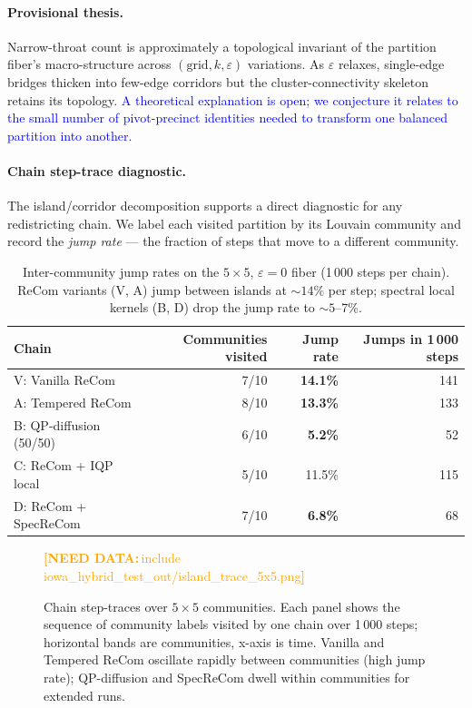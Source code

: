 \documentclass[11pt]{article}
\newcommand{\needdata}[1]{\textcolor{orange}{\textbf{[NEED DATA:}\,#1\textbf{]}}}
\newcommand{\draft}[1]{\textcolor{blue}{#1}}
\begin{document}
\paragraph{Provisional thesis.} Narrow-throat count is approximately a
topological invariant of the partition fiber's macro-structure across
$(\text{grid}, k, \varepsilon)$ variations. As $\varepsilon$ relaxes,
single-edge bridges thicken into few-edge corridors but the
cluster-connectivity skeleton retains its topology. \draft{A
theoretical explanation is open; we conjecture it relates to the
small number of pivot-precinct identities needed to transform one
balanced partition into another.}

\paragraph{Chain step-trace diagnostic.}\label{sec:fiber-trace}

The island/corridor decomposition supports a direct diagnostic for any
redistricting chain. We label each visited partition by its Louvain
community and record the \emph{jump rate} --- the fraction of steps
that move to a different community.

\begin{table}[H]
\centering
\small
\begin{tabular}{lrrr}
\toprule
Chain & Communities visited & Jump rate & Jumps in 1\,000 steps \\
\midrule
V: Vanilla ReCom       & 7/10 & \textbf{14.1\%} & 141 \\
A: Tempered ReCom      & 8/10 & \textbf{13.3\%} & 133 \\
B: QP-diffusion (50/50) & 6/10 & \textbf{5.2\%}  & 52  \\
C: ReCom + IQP local   & 5/10 & 11.5\%           & 115 \\
D: ReCom + SpecReCom   & 7/10 & \textbf{6.8\%}  & 68  \\
\bottomrule
\end{tabular}
\caption{Inter-community jump rates on the $5 \times 5$,
  $\varepsilon = 0$ fiber (1\,000 steps per chain). ReCom variants
  (V, A) jump between islands at $\sim 14\%$ per step; spectral local
  kernels (B, D) drop the jump rate to $\sim 5$--7\%.}\label{tab:island-trace}
\end{table}

\begin{figure}[H]
  \centering
  \needdata{include iowa\_hybrid\_test\_out/island\_trace\_5x5.png}\\
  \caption{Chain step-traces over $5 \times 5$ communities. Each panel
    shows the sequence of community labels visited by one chain over
    1\,000 steps; horizontal bands are communities, x-axis is time.
    Vanilla and Tempered ReCom oscillate rapidly between communities
    (high jump rate); QP-diffusion and SpecReCom dwell within
    communities for extended runs.}
  \label{fig:island-trace}
\end{figure}
\end{document}

